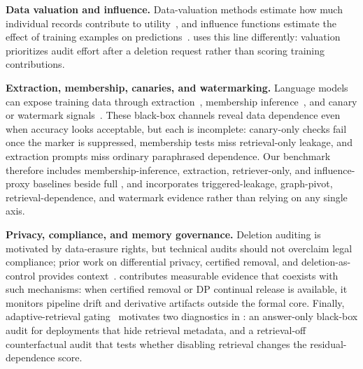 \textbf{Data valuation and influence.}
Data-valuation methods estimate how much individual records contribute to utility~\cite{ghorbani2019datashapley,jia2019data,kwon2021betashapley,wang2023databanzhaf}, and influence functions estimate the effect of training examples on predictions~\cite{koh2017influence,pruthi2020tracin,feldman2020memorization,ilyas2022datamodels}. \method{} uses this line differently: valuation prioritizes audit effort after a deletion request rather than scoring training contributions.

\textbf{Extraction, membership, canaries, and watermarking.}
Language models can expose training data through extraction~\cite{carlini2021extracting,carlini2019secretsharer,carlini2023quantifying}, membership inference~\cite{shokri2017membership,yeom2018privacy,mattern2023membership}, and canary or watermark signals~\cite{kirchenbauer2023watermark,zhao2023watermarksurvey}. These black-box channels reveal data dependence even when accuracy looks acceptable, but each is incomplete: canary-only checks fail once the marker is suppressed, membership tests miss retrieval-only leakage, and extraction prompts miss ordinary paraphrased dependence. Our benchmark therefore includes membership-inference, extraction, retriever-only, and influence-proxy baselines beside full \method{}, and incorporates triggered-leakage, graph-pivot, retrieval-dependence, and watermark evidence rather than relying on any single axis.

\textbf{Privacy, compliance, and memory governance.}
Deletion auditing is motivated by data-erasure rights, but technical audits should not overclaim legal compliance; prior work on differential privacy, certified removal, and deletion-as-control provides context~\cite{dwork2006dp,voigt2017gdpr,guo2020certified,cohen2022deletioncontrol}. \method{} contributes measurable evidence that coexists with such mechanisms: when certified removal or DP continual release is available, it monitors pipeline drift and derivative artifacts outside the formal core. Finally, adaptive-retrieval gating~\cite{wang2024ragate} motivates two diagnostics in \bench{}: an answer-only black-box audit for deployments that hide retrieval metadata, and a retrieval-off counterfactual audit that tests whether disabling retrieval changes the residual-dependence score.
